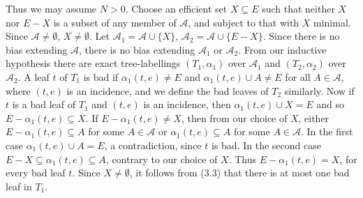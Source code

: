 Thus we may assume $N > 0$. Choose an efficient set $X \subseteq E$ such that neither $X$ nor $E - X$ is a subset of any member of $\mathscr{A}$, and subject to that with $X$ minimal. Since $\mathscr{A} \ne \emptyset$, $X \ne \emptyset$. Let $\mathscr{A}_1 = \mathscr{A} \cup \{X\}$, $\mathscr{A}_2 = \mathscr{A} \cup \{E - X\}$. Since there is no bias extending $\mathscr{A}$, there is no bias extending $\mathscr{A}_1$ or $\mathscr{A}_2$. From our inductive hypothesis there are exact tree-labellings $(T_1, \alpha_1)$ over $\mathscr{A}_1$ and $(T_2, \alpha_2)$ over $\mathscr{A}_2$. A leaf $t$ of $T_1$ is bad if $\alpha_1(t, e) \ne E$ and $\alpha_1(t, e) \cup A \ne E$ for all $A \in \mathscr{A}$, where $(t, e)$ is an incidence, and we define the bad leaves of $T_2$ similarly. Now if $t$ is a bad leaf of $T_1$ and $(t, e)$ is an incidence, then $\alpha_1(t, e) \cup X = E$ and so $E - \alpha_1(t, e) \subseteq X$. If $E - \alpha_1(t, e) \ne X$, then from our choice of $X$, either $E - \alpha_1(t, e) \subseteq A$ for some $A \in \mathscr{A}$ or $\alpha_1(t, e) \subseteq A$ for some $A \in \mathscr{A}$. In the first case $\alpha_1(t, e) \cup A = E$, a contradiction, since $t$ is bad. In the second case $E - X \subseteq \alpha_1(t, e) \subseteq A$, contrary to our choice of $X$. Thus $E - \alpha_1(t, e) = X$, for every bad leaf $t$. Since $X \ne \emptyset$, it follows from (3.3) that there is at most one bad leaf in $T_1$.
